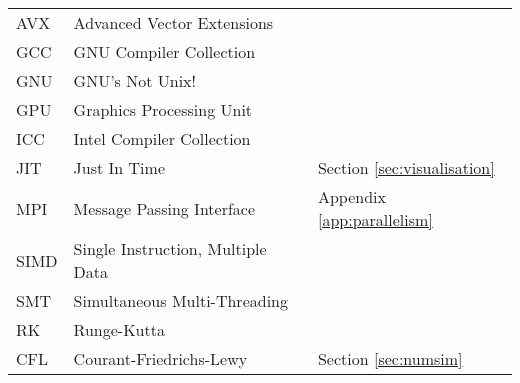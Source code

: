 \begin{abbreviations}
\begin{table}[h]
\begin{tabular}{lll}
    \hline

    AVX  & Advanced Vector Extensions & \\
    GCC  & GNU Compiler Collection & \\
    GNU  & GNU's Not Unix! & \\
    GPU  & Graphics Processing Unit & \\
    ICC  & Intel Compiler Collection & \\
    JIT  & Just In Time & Section \ref{sec:visualisation} \\
    MPI  & Message Passing Interface & Appendix \ref{app:parallelism} \\
    SIMD & Single Instruction, Multiple Data & \\
    SMT  & Simultaneous Multi-Threading & \\

    \hline

    RK & Runge-Kutta & \\
    CFL & Courant-Friedrichs-Lewy & Section \ref{sec:numsim} \\

  \end{tabular} 
  \label{tbl:Abbreviations}
\end{table}



\end{abbreviations}
